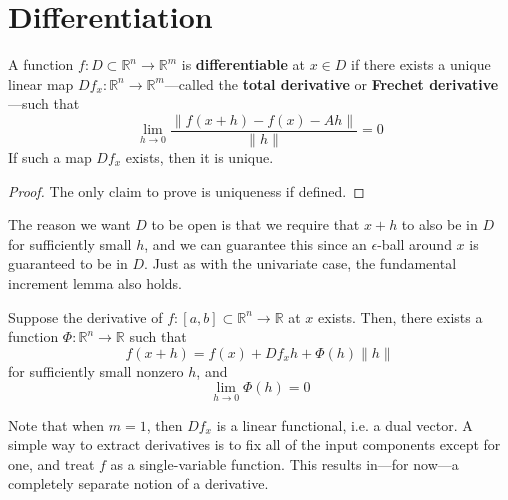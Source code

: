 \section{Differentiation}

  \begin{definition}
    A function $f: D \subset \mathbb{R}^n \longrightarrow \mathbb{R}^m$ is \textbf{differentiable} at $x \in D$ if there exists a unique linear map $Df_x: \mathbb{R}^n \longrightarrow \mathbb{R}^m$---called the \textbf{total derivative} or \textbf{Frechet derivative}---such that 
    \begin{equation}
      \lim_{h \to 0} \frac{\| f(x + h) - f(x) - A h \|}{\| h \|} = 0 
    \end{equation} 
    If such a map $D f_x$ exists, then it is unique. 
  \end{definition}
  \begin{proof}
    The only claim to prove is uniqueness if defined. 
  \end{proof} 

  The reason we want $D$ to be open is that we require that $x + h$ to also be in $D$ for sufficiently small $h$, and we can guarantee this since an $\epsilon$-ball around $x$ is guaranteed to be in $D$. Just as with the univariate case, the fundamental increment lemma also holds. 

  \begin{lemma}
    Suppose the derivative of $f: [a, b] \subset \mathbb{R}^n \to \mathbb{R}$ at $x$ exists. Then, there exists a function $\Phi: \mathbb{R}^n \to \mathbb{R}$ such that 
    \begin{equation}
      f(x + h) = f(x) + Df_x h + \Phi(h) \|h\|
    \end{equation}
    for sufficiently small nonzero $h$, and 
    \begin{equation}
      \lim_{h \to 0} \Phi(h) = 0
    \end{equation}
  \end{lemma}

  Note that when $m = 1$, then $Df_x$ is a linear functional, i.e. a dual vector. A simple way to extract derivatives is to fix all of the input components except for one, and treat $f$ as a single-variable function. This results in---for now---a completely separate notion of a derivative. 

